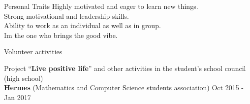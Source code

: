 \documentclass{resume} %
\begin{document}
\begin{rSection}{Personal Traits}    
    Highly motivated and eager to learn new things.\\
    Strong motivational and leadership skills.\\
    Ability to work as an individual as well as in group.\\
    I\textquotesingle m the one who brings the good vibe.

\end{rSection}

\begin{rSection}{Volunteer activities} 
 
    Project “\textbf{Live positive life}” and other activities in the student’s school council (high school)\\
    \textbf{Hermes} (Mathematics and Computer Science students association) Oct 2015 - Jan 2017 

\end{rSection}




\end{document}
